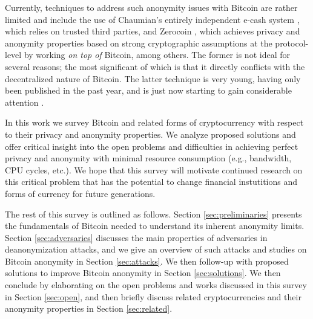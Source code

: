 Currently, techniques to address such anonymity issues with Bitcoin are rather limited and include the use of Chaumian's entirely independent e-cash system \cite{chaumain}, which relies on trusted third parties, and Zerocoin \cite{zerocoin}, which achieves privacy and anonymity properties based on strong cryptographic assumptions at the protocol-level by working \emph{on top of} Bitcoin, among others. The former is not ideal for several reasons; the most significant of which is that it directly conflicts with the decentralized nature of Bitcoin. The latter technique is very young, having only been published in the past year, and is just now starting to gain considerable attention \cite{pinocchio}. 

In this work we survey Bitcoin and related forms of cryptocurrency with respect to their privacy and anonymity properties. We analyze proposed solutions and offer critical insight into the open problems and difficulties in achieving perfect privacy and anonymity with minimal resource consumption (e.g., bandwidth, CPU cycles, etc.). We hope that this survey will motivate continued research on this critical problem that has the potential to change financial instutitions and forms of currency for future generations.

The rest of this survey is outlined as follows. Section \ref{sec:preliminaries} presents the fundamentals of Bitcoin needed to understand its inherent anonymity limits. Section \ref{sec:adversaries} discusses the main properties of adversaries in deanonymization attacks, and we give an overview of such attacks and studies on Bitcoin anonymity in Section \ref{sec:attacks}. We then follow-up with proposed solutions to improve Bitcoin anonymity in Section \ref{sec:solutions}. We then conclude by elaborating on the open problems and works discussed in this survey in Section \ref{sec:open}, and then briefly discuss related cryptocurrencies and their anonymity properties in Section \ref{sec:related}.


